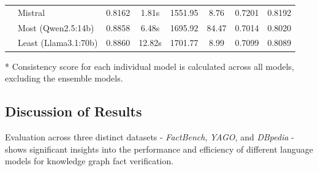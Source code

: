 \begin{table}[ht!]
{\begin{threeparttable}
\begin{tabular}{llcccc||cc}
                                            & Mistral                            & 0.8162                         & 1.81s                            & 1551.95                                       & 8.76             & 0.7201    & 0.8192   \\ \cline{2-8}
                                            & Most (Qwen2.5:14b)                 & 0.8858                         & 6.48s                            & 1695.92                                       & 84.47            & 0.7014    & 0.8020   \\
                                            & Least (Llama3.1:70b)               & 0.8860                         & 12.82s                           & 1701.77                                       & 8.99             & 0.7099    & 0.8089   \\
                \bottomrule
            \end{tabular}
            \begin{tablenotes}
                \item[*] Consistency score for each individual model is calculated across all models, excluding the ensemble models.
            \end{tablenotes}
        \end{threeparttable}}
    \label{tab:evaluation_results-full-wo-category-all-datasets}
\end{table}

\subsection{Discussion of Results}\label{subsec:discussion-of-results}
Evaluation across three distinct datasets - \textit{FactBench}, \textit{YAGO}, and \textit{DBpedia} - shows significant insights into the performance and efficiency of different language models for knowledge graph fact verification.

